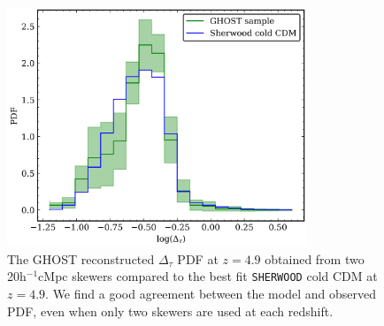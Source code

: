 \begin{figure}[ht!]
    \centering
    \includegraphics[width=0.8\textwidth]{img/ML/fit_ghost_z49.png}
    \caption{The GHOST reconstructed $\Delta_\tau$ PDF at $z=4.9$ obtained from two 20h$^{-1}$cMpc skewers compared to the best fit \texttt{SHERWOOD} cold CDM at $z=4.9$. We find a good agreement between the model and observed PDF, even when only two skewers are used at each redshift.}
    \label{fig: ghost fit}
\end{figure}

